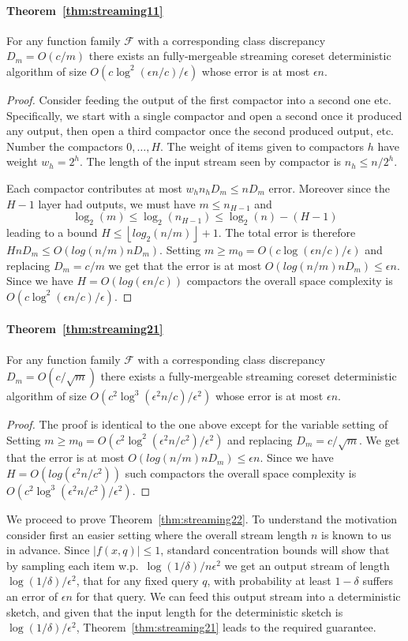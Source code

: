 \documentclass[12pt]{colt2019} %
\newcommand{\eps}{\epsilon}
\newcommand{\F}{\mathcal{F}}
\newcommand{\floor}[1]{\left \lfloor #1 \right \rfloor}
\begin{document}
\paragraph{Theorem~\ref{thm:streaming11}}
For any function family $\F$ with a corresponding class discrepancy $D_m = O(c/m)$ there exists an fully-mergeable streaming coreset deterministic algorithm of size $O\left(c\log^2(\eps n/c)/\eps\right)$ whose error is at most $\eps n$.
\begin{proof}
Consider feeding the output of the first compactor into a second one etc. Specifically, we start with a single compactor and open a second once it produced any output, then open a third compactor once the second produced output, etc.
Number the compactors $0,\ldots,H$. The weight of items given to compactors $h$ have weight $w_h = 2^h$. The length of the input stream seen by compactor is $n_h \le n/2^h$.

Each compactor contributes at most $w_h n_h D_m \le n D_m$ error. Moreover since the $H-1$ layer had outputs, we must have $m \leq n_{H-1}$ and
$$  \log_2(m) \leq \log_2(n_{H-1}) \leq \log_2(n) - (H-1)$$
leading to a bound $H \le \floor{log_2(n/m)}+1$.
The total error is therefore $H n D_m \le O(log(n/m) n D_m)$. 
Setting $m \ge m_0 = O(c\log(\eps n/c)/\eps)$ and replacing $D_m = c/m$ we get that the error is at most $O(log(n/m) n D_m) \le \eps n$.
Since we have $H = O(log(\eps n/c))$ compactors the overall space complexity is $O(c\log^2(\eps n/c)/\eps)$. 
\end{proof}

\paragraph{Theorem~\ref{thm:streaming21}}
For any function family $\F$ with a corresponding class discrepancy $D_m = O(c/\sqrt{m})$ there exists a fully-mergeable streaming coreset deterministic algorithm of size $O\left(c^2\log^3(\eps^2 n/c) /\eps^2\right)$ whose error is at most $\eps n$. 
\begin{proof}
The proof is identical to the one above except for the variable setting of
Setting $m \ge m_0 = O(c^2\log^2(\eps^2 n/c^2)/\eps^2)$ and replacing $D_m = c/\sqrt{m}$. 
We get that the error is at most $O(log(n/m) n D_m) \le \eps n$. 
Since we have $H = O(log(\eps^2 n/c^2))$ such compactors the overall space complexity is $O\left(c^2\log^3(\eps^2 n/c^2) /\eps^2\right)$. 
\end{proof}

We proceed to prove Theorem~\ref{thm:streaming22}. To understand the motivation consider first an easier setting where the overall stream length $n$ is known to us in advance. Since $|f(x,q)| \leq 1$, standard concentration bounds will show that by sampling each item w.p.\ $\log(1/\delta)/n\eps^2$ we get an output stream of length $\log(1/\delta)/\eps^2$, that for any fixed query $q$, with probability at least $1-\delta$ suffers an error of $\eps n$ for that query. We can feed this output stream into a deterministic sketch, and given that the input length for the deterministic sketch is $\log(1/\delta)/\eps^2$, Theorem~\ref{thm:streaming21} leads to the required guarantee.
\end{document}
